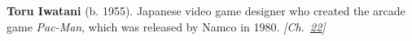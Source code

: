 \textbf{Toru Iwatani} (b. 1955). Japanese video game designer who created the arcade game \emph{Pac-Man}, which was released by Namco in 1980. \emph{[Ch.~\hyperref[ch:minecraftcreeper]{22}]}

